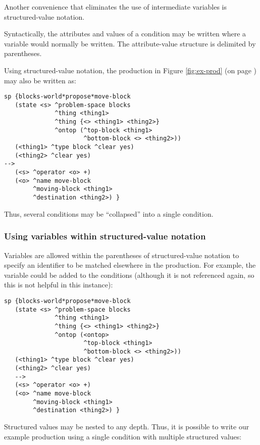 Another convenience that eliminates the use of intermediate variables is structured-value notation. 

Syntactically, the attributes and values of a condition may be written where a variable would normally be written. The attribute-value structure is delimited by parentheses.

Using structured-value notation, the production in Figure \ref{fig:ex-prod} (on page \pageref{fig:ex-prod}) may also be written as:

\begin{verbatim}
sp {blocks-world*propose*move-block
   (state <s> ^problem-space blocks
              ^thing <thing1> 
              ^thing {<> <thing1> <thing2>}
              ^ontop (^top-block <thing1>
                      ^bottom-block <> <thing2>))
   (<thing1> ^type block ^clear yes)
   (<thing2> ^clear yes)
-->
   (<s> ^operator <o> +)
   (<o> ^name move-block
        ^moving-block <thing1>
        ^destination <thing2>) }
\end{verbatim}

Thus, several conditions may be ``collapsed'' into a single condition.


\subsubsection*{Using variables within structured-value notation}

Variables are allowed within the parentheses of structured-value notation to specify an identifier to be matched elsewhere in the production. For example, the variable  could be added to the conditions (although it is not referenced again, so this is not helpful in this instance):

\begin{verbatim}
sp {blocks-world*propose*move-block
   (state <s> ^problem-space blocks
              ^thing <thing1> 
              ^thing {<> <thing1> <thing2>}
              ^ontop (<ontop> 
                      ^top-block <thing1>
                      ^bottom-block <> <thing2>))
   (<thing1> ^type block ^clear yes)
   (<thing2> ^clear yes)
   -->
   (<s> ^operator <o> +)
   (<o> ^name move-block
        ^moving-block <thing1>
        ^destination <thing2>) }
\end{verbatim}

Structured values may be nested to any depth. Thus, it is possible to write our example production using a single condition with multiple structured values:

